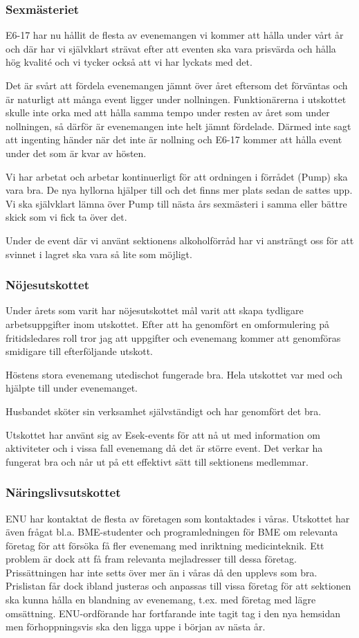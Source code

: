 \documentclass[../_main/handlingar.tex]{subfiles}
\begin{document}
\subsubsection*{Sexmästeriet}
E6-17 har nu hållit de flesta av evenemangen vi kommer att hålla under vårt år och där har vi självklart strävat efter att eventen ska vara prisvärda och hålla hög kvalité och vi tycker också att vi har lyckats med det.

Det är svårt att fördela evenemangen jämnt över året eftersom det förväntas och är naturligt att många event ligger under nollningen. Funktionärerna i utskottet skulle inte orka med att hålla samma tempo under resten av året som under nollningen, så därför är evenemangen inte helt jämnt fördelade. Därmed inte sagt att ingenting händer när det inte är nollning och E6-17 kommer att hålla event under det som är kvar av hösten.

Vi har arbetat och arbetar kontinuerligt för att ordningen i förrådet (Pump) ska vara bra. De nya hyllorna hjälper till och det finns mer plats sedan de sattes upp. Vi ska självklart lämna över Pump till nästa års sexmästeri i samma eller bättre skick som vi fick ta över det.

Under de event där vi använt sektionens alkoholförråd har vi ansträngt oss för att svinnet i lagret ska vara så lite som möjligt.

\subsubsection*{Nöjesutskottet}
Under årets som varit har nöjesutskottet mål varit att skapa tydligare arbetsuppgifter inom utskottet. Efter att ha genomfört en omformulering på fritidsledares roll tror jag att uppgifter och evenemang kommer att genomföras smidigare till efterföljande utskott.

Höstens stora evenemang utedischot fungerade bra. Hela utskottet var med och hjälpte till under evenemanget.

Husbandet sköter sin verksamhet självständigt och har genomfört det bra.

Utskottet har använt sig av Esek-events för att nå ut med information om aktiviteter och i vissa fall evenemang då det är större event. Det verkar ha fungerat bra och når ut på ett effektivt sätt till sektionens medlemmar.

\subsubsection*{Näringslivsutskottet}
ENU har kontaktat de flesta av företagen som kontaktades i våras. Utskottet har även frågat bl.a. BME-studenter och programledningen för BME om relevanta företag för att försöka få fler evenemang med inriktning medicinteknik. Ett problem är dock att få fram relevanta mejladresser till dessa företag. Prissättningen har inte setts över mer än i våras då den upplevs som bra. Prislistan får dock ibland justeras och anpassas till vissa företag för att sektionen ska kunna hålla en blandning av evenemang, t.ex. med företag med lägre omsättning. ENU-ordförande har fortfarande inte tagit tag i den nya hemsidan men förhoppningsvis ska den ligga uppe i början av nästa år.
\end{document}
